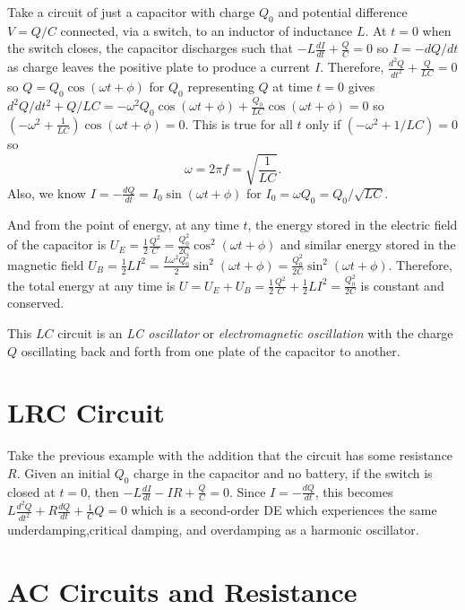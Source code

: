 \begin{remark}
    Take a circuit of just a capacitor with charge $Q_0$ and potential difference $V = Q/C$ connected, via a switch, to an inductor of inductance $L$. At $t=0$ when the switch closes, the capacitor discharges such that $-L\frac{dI}{dt} + \frac{Q}{C} = 0$ so $I = -dQ/dt$ as charge leaves the positive plate to produce a current $I$. Therefore, $\frac{d^2Q}{dt^2} + \frac{Q}{LC} = 0$ so $Q = Q_0\cos(\omega t + \phi)$ for $Q_0$ representing $Q$ at time $t=0$ gives $d^2Q/dt^2 + Q/LC = -\omega^2Q_0\cos(\omega t + \phi) + \frac{Q_0}{LC}\cos(\omega t + \phi) = 0$ so $(-\omega^2+\frac{1}{LC})\cos(\omega t + \phi) = 0$. This is true for all $t$ only if $(-\omega^2 + 1/LC) = 0$ so $$\omega = 2\pi f = \sqrt{\frac{1}{LC}}.$$ Also, we know $I = -\frac{dQ}{dt} = I_0\sin(\omega t + \phi)$ for $I_0 = \omega Q_0=Q_0/\sqrt{LC}$.

    And from the point of energy, at any time $t$, the energy stored in the electric field of the capacitor is $U_E = \frac{1}{2}\frac{Q^2}{C} = \frac{Q_0^2}{2C}\cos^2(\omega t + \phi)$ and similar energy stored in the magnetic field $U_B = \frac{1}{2}LI^2 = \frac{L\omega^2Q_0^2}{2}\sin^2(\omega t + \phi) = \frac{Q_0^2}{2C}\sin^2(\omega t + \phi)$. Therefore, the total energy at any time is $U = U_E + U_B = \frac{1}{2}\frac{Q^2}{C} + \frac{1}{2}LI^2 = \frac{Q_0^2}{2C}$ is constant and conserved.

    This $LC$ circuit is an \emph{LC oscillator} or \emph{electromagnetic oscillation} with the charge $Q$ oscillating back and forth from one plate of the capacitor to another. 
\end{remark}

\section{LRC Circuit}

\begin{remark}
    Take the previous example with the addition that the circuit has some resistance $R$. Given an initial $Q_0$ charge in the capacitor and no battery, if the switch is closed at $t = 0$, then $-L\frac{dI}{dt} - IR + \frac{Q}{C} = 0$. Since $I = -\frac{dQ}{dt}$, this becomes $L\frac{d^2Q}{dt^2} + R\frac{dQ}{dt} + \frac{1}{C}Q = 0$ which is a second-order DE which experiences the same underdamping,critical damping, and overdamping as a harmonic oscillator.
\end{remark}

\section{AC Circuits and Resistance}